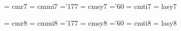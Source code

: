  \font\sevrm  = cmr7               %
 \font\sevmi  = cmmi7              %
    \skewchar\sevmi ='177          %
 \font\sevsy  = cmsy7              %
    \skewchar\sevsy ='60           %
 \font\sevit  = cmti7              %
 \font\sevly  = lasy7             %
 
 \font\egtrm  = cmr8               %
 \font\egtmi  = cmmi8              %
    \skewchar\egtmi ='177          %
 \font\egtsy  = cmsy8              %
    \skewchar\egtsy ='60           %
 \font\egtit  = cmti8              %
 \font\egtly  = lasy8             %
 
